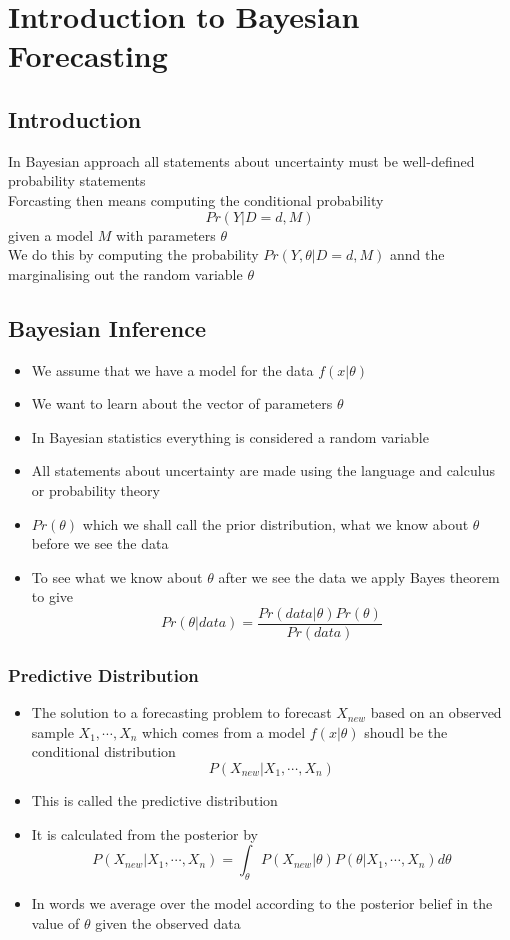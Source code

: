 \documentclass[11pt]{article}
\begin{document}
\newpage

\section{Introduction to Bayesian Forecasting}
\subsection{Introduction}
In Bayesian approach all statements about uncertainty must be well-defined probability statements \\
Forcasting then means computing the conditional probability \[Pr(Y|D=d,M)\]given a model $M$ with parameters $\theta$ \\
We do this by computing the probability $Pr(Y,\theta|D=d,M)$ annd the marginalising out the random variable $\theta$
\subsection{Bayesian Inference}
\begin{itemize}
    \item We assume that we have a model for the data $f(x|\theta)$
    \item We want to learn about the vector of parameters $\theta$
    \item In Bayesian statistics everything is considered a random variable 
    \item All statements about uncertainty are made using the language and calculus or probability theory 
    \item $Pr(\theta)$ which we shall call the prior distribution, what we know about $\theta$ before we see the data 
    \item To see what we know about $\theta$ after we see the data we apply Bayes theorem to give \[Pr(\theta|data) = \frac{Pr(data|\theta)Pr(\theta)}{Pr(data)}\]
\end{itemize}
\subsubsection{Predictive Distribution}
\begin{itemize}
    \item The solution to a forecasting problem to forecast $X_{new}$ based on an observed sample $X_1,\cdots,X_n$ which comes from a model $f(x|\theta)$ shoudl be the conditional distribution \[P(X_{new}|X_1,\cdots,X_n)\]    
    \item This is called the predictive distribution 
    \item It is calculated from the posterior by \[P(X_{new}|X_1,\cdots,X_n) = \int_{\theta}P(X_{new}|\theta)P(\theta|X_1,\cdots,X_n)d\theta\] 
    \item In words we average over the model according to the posterior belief in the value of $\theta$ given the observed data 
\end{itemize}
\end{document}

